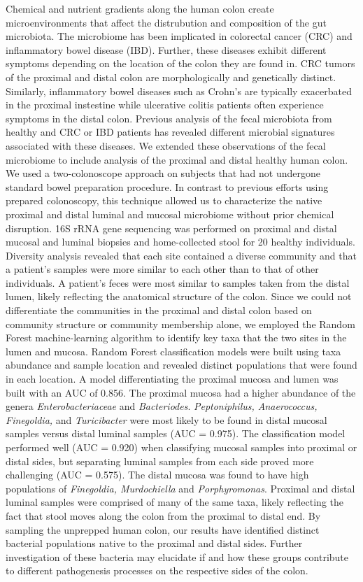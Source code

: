 \documentclass[11pt,]{article}
\begin{document}
Chemical and nutrient gradients along the human colon create
microenvironments that affect the distrubution and composition of the
gut microbiota. The microbiome has been implicated in colorectal cancer
(CRC) and inflammatory bowel disease (IBD). Further, these diseases
exhibit different symptoms depending on the location of the colon they
are found in. CRC tumors of the proximal and distal colon are
morphologically and genetically distinct. Similarly, inflammatory bowel
diseases such as Crohn's are typically exacerbated in the proximal
instestine while ulcerative colitis patients often experience symptoms
in the distal colon. Previous analysis of the fecal microbiota from
healthy and CRC or IBD patients has revealed different microbial
signatures associated with these diseases. We extended these
observations of the fecal microbiome to include analysis of the proximal
and distal healthy human colon. We used a two-colonoscope approach on
subjects that had not undergone standard bowel preparation procedure. In
contrast to previous efforts using prepared colonoscopy, this technique
allowed us to characterize the native proximal and distal luminal and
mucosal microbiome without prior chemical disruption. 16S rRNA gene
sequencing was performed on proximal and distal mucosal and luminal
biopsies and home-collected stool for 20 healthy individuals. Diversity
analysis revealed that each site contained a diverse community and that
a patient's samples were more similar to each other than to that of
other individuals. A patient's feces were most similar to samples taken
from the distal lumen, likely reflecting the anatomical structure of the
colon. Since we could not differentiate the communities in the proximal
and distal colon based on community structure or community membership
alone, we employed the Random Forest machine-learning algorithm to
identify key taxa that the two sites in the lumen and mucosa. Random
Forest classification models were built using taxa abundance and sample
location and revealed distinct populations that were found in each
location. A model differentiating the proximal mucosa and lumen was
built with an AUC of 0.856. The proximal mucosa had a higher abundance
of the genera \emph{Enterobacteriaceae} and \emph{Bacteriodes}.
\emph{Peptoniphilus, Anaerococcus, Finegoldia,} and \emph{Turicibacter}
were most likely to be found in distal mucosal samples versus distal
luminal samples (AUC = 0.975). The classification model performed well
(AUC = 0.920) when classifying mucosal samples into proximal or distal
sides, but separating luminal samples from each side proved more
challenging (AUC = 0.575). The distal mucosa was found to have high
populations of \emph{Finegoldia, Murdochiella} and \emph{Porphyromonas}.
Proximal and distal luminal samples were comprised of many of the same
taxa, likely reflecting the fact that stool moves along the colon from
the proximal to distal end. By sampling the unprepped human colon, our
results have identified distinct bacterial populations native to the
proximal and distal sides. Further investigation of these bacteria may
elucidate if and how these groups contribute to different pathogenesis
processes on the respective sides of the colon.
\end{document}
